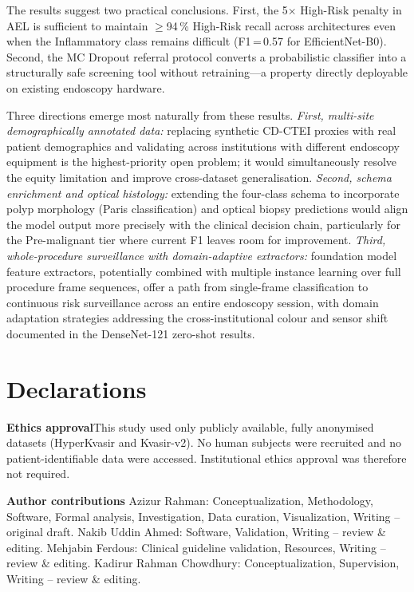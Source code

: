 \documentclass[11pt,a4paper]{article}
\begin{document}
The results suggest two practical conclusions. First, the 5$\times$
High-Risk penalty in AEL is sufficient to maintain $\geq$94\,\%
High-Risk recall across architectures even when the Inflammatory class
remains difficult (F1\,=\,0.57 for EfficientNet-B0). Second, the
MC Dropout referral protocol converts a probabilistic classifier into
a structurally safe screening tool without retraining---a property
directly deployable on existing endoscopy hardware.

Three directions emerge most naturally from these results. \emph{First,
multi-site demographically annotated data:} replacing synthetic CD-CTEI
proxies with real patient demographics and validating across institutions
with different endoscopy equipment is the highest-priority open problem;
it would simultaneously resolve the equity limitation and improve
cross-dataset generalisation. \emph{Second, schema enrichment and optical
histology:} extending the four-class schema to incorporate polyp morphology
(Paris classification) and optical biopsy predictions would align the model
output more precisely with the clinical decision chain, particularly for
the Pre-malignant tier where current F1 leaves room for improvement.
\emph{Third, whole-procedure surveillance with domain-adaptive extractors:}
foundation model feature extractors, potentially combined with multiple
instance learning over full procedure frame sequences, offer a path from
single-frame classification to continuous risk surveillance across an entire
endoscopy session, with domain adaptation strategies addressing the
cross-institutional colour and sensor shift documented in the DenseNet-121
zero-shot results.

\section*{Declarations}

\noindent\textbf{Ethics approval}\quad This study used only publicly
available, fully anonymised datasets (HyperKvasir and Kvasir-v2). No
human subjects were recruited and no patient-identifiable data were
accessed. Institutional ethics approval was therefore not required.

\noindent\textbf{Author contributions}\quad
Azizur Rahman: Conceptualization, Methodology, Software, Formal analysis,
Investigation, Data curation, Visualization, Writing -- original draft.
Nakib Uddin Ahmed: Software, Validation, Writing -- review \& editing.
Mehjabin Ferdous: Clinical guideline validation, Resources,
Writing -- review \& editing.
Kadirur Rahman Chowdhury: Conceptualization, Supervision,
Writing -- review \& editing.
\end{document}
